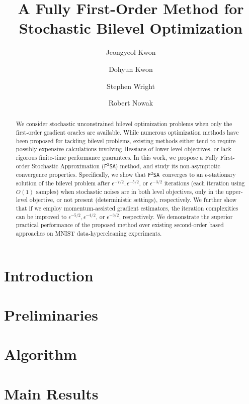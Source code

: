 \documentclass[11pt]{article}
\title{\bf{\LARGE{A Fully First-Order Method for Stochastic Bilevel Optimization}}}
\author[1]{Jeongyeol Kwon}
\author[1]{Dohyun Kwon}
\author[1]{Stephen Wright}
\author[1]{Robert Nowak}
\affil[1]{Wisconsin Institute for Discovery, UW-Madison}
\newcommand{\algname}{\texttt{F$^2$SA}}
\begin{document}
\maketitle


\begin{abstract}
    We consider stochastic unconstrained bilevel optimization problems when only the first-order gradient oracles are available. 
    While numerous optimization methods have been proposed for tackling bilevel problems, existing methods either tend to require possibly expensive calculations involving Hessians of lower-level objectives, or lack rigorous finite-time performance guarantees. 
    In this work, we propose a Fully First-order Stochastic Approximation (\algname) method, 
    and study its non-asymptotic convergence properties. Specifically, we show that \algname~converges to an $\epsilon$-stationary solution of the bilevel problem after $\epsilon^{-7/2}, \epsilon^{-5/2}$, or $\epsilon^{-3/2}$ iterations (each iteration using $O(1)$ samples)  when stochastic noises are in both level objectives, only in the upper-level objective, or not present (deterministic settings), respectively. 
    We further show that if we employ momentum-assisted gradient estimators, the iteration complexities can be improved to $\epsilon^{-5/2}, \epsilon^{-4/2}$, or $\epsilon^{-3/2}$, respectively. 
    We demonstrate the superior practical performance of the proposed method over existing second-order based approaches on MNIST data-hypercleaning experiments.
\end{abstract}


\section{Introduction}


\section{Preliminaries}





\section{Algorithm}
\label{section:algorithm}



\section{Main Results}
\label{section:analysis}

\end{document}
